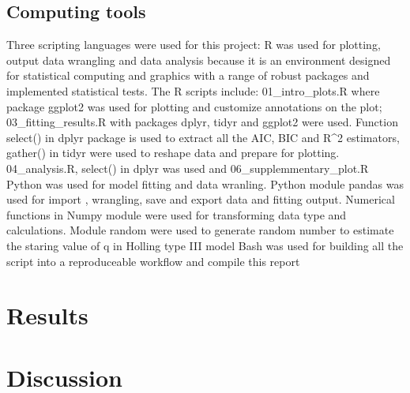 \documentclass[11pt, a4paper]{article}
\begin{document}
\subsection{Computing tools}
Three scripting languages were used for this project:
R was used for plotting, output data wrangling and data analysis because it is an environment designed for statistical computing and graphics with a range of robust packages and implemented statistical tests. The R scripts include: 01_intro_plots.R where package ggplot2 was used for plotting and customize annotations on the plot; 03_fitting_results.R with packages dplyr, tidyr and ggplot2 were used. Function select() in dplyr package is used to extract all the AIC, BIC and R^2 estimators,  gather() in tidyr were used to reshape data and prepare for plotting.  04_analysis.R, select() in dplyr was used and 06_supplemmentary_plot.R 
Python was used for model fitting and data wranling. Python module pandas was used for import , wrangling, save and export data and fitting output. Numerical functions in Numpy module were used for transforming data type and calculations. Module random were used to generate random number to estimate the staring value of q in Holling type III model 
Bash was used for building all the script into a reproduceable workflow and compile this report

\section{Results}

\section{Discussion}





\end{document}
